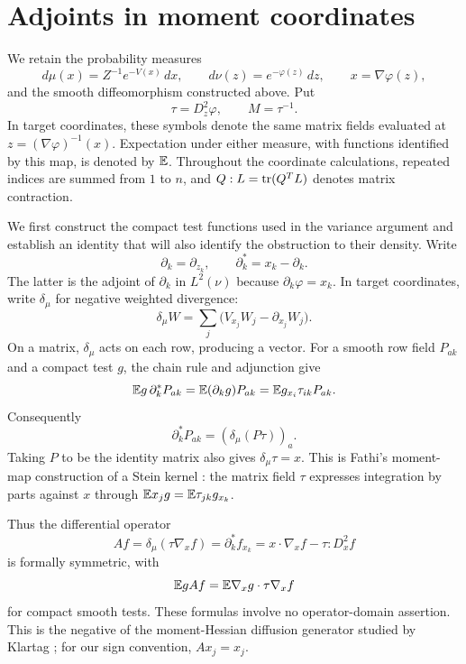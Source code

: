 \section{Adjoints in moment coordinates}\label{sec:identities}

We retain the probability measures
\[
 d\mu(x)=Z^{-1}e^{-V(x)}\,dx,
 \qquad d\nu(z)=e^{-\varphi(z)}\,dz,
 \qquad x=\nabla\varphi(z),
\]
and the smooth diffeomorphism constructed above.  Put
\[
 \tau=D_z^2\varphi,\qquad M=\tau^{-1}.
\]
In target coordinates, these symbols denote the same matrix fields
evaluated at $z=(\nabla\varphi)^{-1}(x)$.
Expectation under either measure, with functions identified by this map,
is denoted by $\mathbb E$.
Throughout the coordinate calculations, repeated indices are summed
from $1$ to $n$, and $Q:L=\operatorname{tr}(Q^TL)$ denotes matrix contraction.

We first construct the compact test functions used in the variance
argument and establish an identity that will also identify the
obstruction to their density.  Write
\[
 \partial_k=\partial_{z_k},\qquad
 \partial_k^*=x_k-\partial_k.
\]
The latter is the adjoint of $\partial_k$ in $L^2(\nu)$ because
$\partial_k\varphi=x_k$.  In target coordinates, write $\delta_\mu$
for negative weighted divergence:
\[
 \delta_\mu W
 =\sum_j\bigl(V_{x_j}W_j-\partial_{x_j}W_j\bigr).
\]
On a matrix, $\delta_\mu$ acts on each row, producing a vector.
For a smooth row field $P_{ak}$ and a compact test $g$, the chain rule
and adjunction give
\[
 \mathbb E g\,\partial_k^*P_{ak}
 =\mathbb E(\partial_k g)P_{ak}
 =\mathbb E g_{x_i}\tau_{ik}P_{ak}.
\]
Consequently
\begin{equation}\label{eq:row-adjoint}
 \partial_k^*P_{ak}=(\delta_\mu(P\tau))_a.
\end{equation}
Taking $P$ to be the identity matrix also gives $\delta_\mu\tau=x$.
This is Fathi's moment-map construction of a Stein kernel
\cite[Theorem~2.3 of the cited arXiv version]{Fathi2019}: the matrix
field $\tau$ expresses integration by parts against $x$ through
$\mathbb E x_j g=\mathbb E\tau_{jk}g_{x_k}$.

Thus the differential operator
\begin{equation}\label{eq:operator-A}
 Af=\delta_\mu(\tau\nabla_x f)
   =\partial_k^*f_{x_k}
   =x\cdot\nabla_x f-\tau:D_x^2f
\end{equation}
is formally symmetric, with
\begin{equation}\label{eq:A-form}
 \mathbb E gAf=\mathbb E\nabla_xg\cdot\tau\nabla_xf
\end{equation}
for compact smooth tests.  These formulas involve no operator-domain
assertion. This is the negative of the moment-Hessian diffusion
generator studied by Klartag \cite[Section~6]{KlartagArxiv2013};
for our sign convention, $Ax_j=x_j$.

